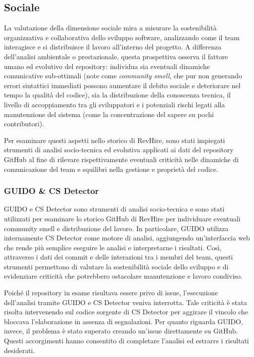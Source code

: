\documentclass[12pt,a4paper]{article}
\begin{document}
    \subsection{Sociale}
    La valutazione della dimensione sociale mira a misurare la sostenibilità organizzativa e collaborativa dello
    sviluppo software, analizzando come il team interagisce e si distribuisce il lavoro all'interno del progetto.
    A differenza dell'analisi ambientale o prestazionale, questa prospettiva osserva il fattore umano ed evolutivo
    del repository: individua sia eventuali dinamiche comunicative sub-ottimali (note come \emph{community smell},
    che pur non generando errori sintattici immediati possono aumentare il debito sociale e deteriorare nel tempo la
    qualità del codice), sia la distribuzione della conoscenza tecnica, il livello di accoppiamento tra gli sviluppatori
    e i potenziali rischi legati alla manutenzione del sistema (come la concentrazione del sapere su pochi contributori).

    Per esaminare questi aspetti nello storico di RevHire, sono stati impiegati strumenti di analisi socio-tecnica
    ed evolutiva applicati ai dati del repository GitHub al fine di rilevare rispettivamente eventuali criticità nelle
    dinamiche di comunicazione del team e squilibri nella gestione e proprietà del codice.

    \subsubsection{GUIDO \& CS Detector}
    GUIDO e CS Detector sono strumenti di analisi socio-tecnica e sono stati utilizzati per esaminare lo storico GitHub
    di RevHire per individuare eventuali community smell e distribuzione del lavoro. In particolare, GUIDO
    utilizza internamente CS Detector come motore di analisi, aggiungendo un’interfaccia web che rende
    più semplice eseguire le analisi e interpretarne i risultati. Così,
    attraverso i dati dei commit e delle interazioni tra i membri del team, questi strumenti permettono
    di valutare la sostenibilità sociale dello sviluppo e di
    evidenziare criticità che potrebbero ostacolare manutenzione e lavoro condiviso.

    Poiché il repository in esame risultava essere privo di issue, l'esecuzione dell'analisi tramite GUIDO e CS Detector veniva interrotta.
    Tale criticità è stata risolta intervenendo sul codice sorgente di CS Detector per aggirare il vincolo che bloccava l'elaborazione
    in assenza di segnalazioni. Per quanto riguarda GUIDO, invece, il problema è stato superato creando un'issue direttamente
    su GitHub. Questi accorgimenti hanno consentito di completare l'analisi ed estrarre i risultati desiderati.
\end{document}
